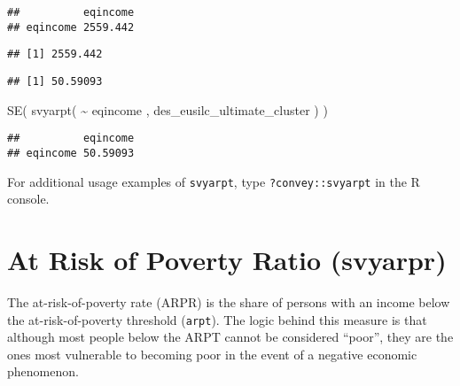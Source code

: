 \documentclass[
]{book}
\newenvironment{Shaded}{\begin{snugshade}}{\end{snugshade}}
\newcommand{\CommentTok}[1]{\textcolor[rgb]{0.56,0.35,0.01}{\textit{#1}}}
\newcommand{\FunctionTok}[1]{\textcolor[rgb]{0.00,0.00,0.00}{#1}}
\newcommand{\NormalTok}[1]{#1}
\newcommand{\SpecialCharTok}[1]{\textcolor[rgb]{0.00,0.00,0.00}{#1}}
\begin{document}
\begin{verbatim}
##          eqincome
## eqincome 2559.442
\end{verbatim}

\begin{Shaded}
\end{Shaded}

\begin{verbatim}
## [1] 2559.442
\end{verbatim}

\begin{Shaded}
\end{Shaded}

\begin{verbatim}
## [1] 50.59093
\end{verbatim}

\begin{Shaded}
\begin{Highlighting}[]
\FunctionTok{SE}\NormalTok{( }\FunctionTok{svyarpt}\NormalTok{( }\SpecialCharTok{\textasciitilde{}}\NormalTok{ eqincome , des\_eusilc\_ultimate\_cluster ) )}
\end{Highlighting}
\end{Shaded}

\begin{verbatim}
##          eqincome
## eqincome 50.59093
\end{verbatim}

For additional usage examples of \texttt{svyarpt}, type \texttt{?convey::svyarpt} in the R console.

\hypertarget{at-risk-of-poverty-ratio-svyarpr}{%
\section{At Risk of Poverty Ratio (svyarpr)}\label{at-risk-of-poverty-ratio-svyarpr}}

The at-risk-of-poverty rate (ARPR) is the share of persons with an income below the at-risk-of-poverty threshold (\texttt{arpt}). The logic behind this measure is that although most people below the ARPT cannot be considered ``poor'', they are the ones most vulnerable to becoming poor in the event of a negative economic phenomenon.
\end{document}
